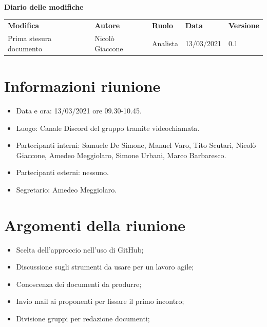 \documentclass[a4paper]{article}
\begin{document}
    \begin{center}
        \textbf{\Large Diario delle modifiche}\\
        \vspace{10px}
        \begin{table}[h!]
        \centering
        \renewcommand{\arraystretch}{1.8}
        \begin{tabular}{p{150px} p{90px} p{50px} p{60px} p{45px}}
        \rowcolor{logo!70} \textbf{Modifica} & \textbf{Autore} & \textbf{Ruolo} & \textbf{Data} & \textbf{Versione}\\
            Prima stesura documento & Nicolò Giaccone & Analista & 13/03/2021 & 0.1\\
        \end{tabular}
    \end{table}
    \end{center}
    \newpage
    \tableofcontents
    \section{Informazioni riunione}
    \begin{itemize}
        \item Data e ora: 13/03/2021 ore 09.30-10.45.
        \item Luogo: Canale Discord del gruppo tramite videochiamata.
        \item Partecipanti interni: Samuele De Simone, Manuel Varo, Tito Scutari, Nicolò Giaccone, Amedeo Meggiolaro, Simone Urbani, Marco Barbaresco.
        \item Partecipanti esterni: nessuno.
        \item Segretario: Amedeo Meggiolaro.
    \end{itemize}
    \section{Argomenti della riunione}
    \begin{itemize}
        \item Scelta dell'approccio nell'uso di GitHub;
        \item Discussione sugli strumenti da usare per un lavoro agile;
        \item Conoscenza dei documenti da produrre;
        \item Invio mail ai proponenti per fissare il primo incontro;
        \item Divisione gruppi per redazione documenti;
    \end{itemize}
\end{document}
